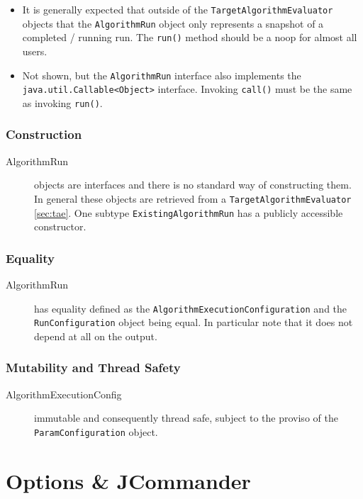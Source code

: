\documentclass[11pt,letterpaper,oneside]{article}
\begin{document}
\begin{itemize}
\item It is generally expected that outside of the \texttt{TargetAlgorithmEvaluator} objects that the \texttt{AlgorithmRun} object only represents a snapshot of a completed / running run. The \texttt{run()} method should be a noop for almost all users.
\item  Not shown, but the \texttt{AlgorithmRun} interface also implements the \texttt{java.util.Callable<Object>} interface. Invoking \texttt{call()} must be the same as invoking \texttt{run()}. 
\end{itemize}

\subsubsection{Construction}
\begin{description}
\item[AlgorithmRun] objects are interfaces and there is no standard way of constructing them. In general these objects are retrieved from a \texttt{TargetAlgorithmEvaluator} \ref{sec:tae}. One subtype \texttt{ExistingAlgorithmRun} has a publicly accessible constructor.
\end{description}
\subsubsection{Equality}
\begin{description}
\item[AlgorithmRun] has equality defined as the \texttt{AlgorithmExecutionConfiguration} and the \texttt{RunConfiguration} object being equal. In particular note that it does not depend at all on the output. 
\end{description}

\subsubsection{Mutability and Thread Safety}
\begin{description}
\item[AlgorithmExecutionConfig] immutable and consequently thread safe, subject to the proviso of the \texttt{ParamConfiguration} object.
\end{description}


\section{Options \& JCommander}
\end{document}
